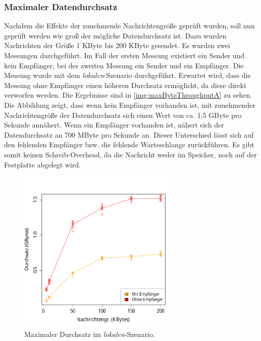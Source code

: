 \subsubsection{Maximaler Datendurchsatz}
\label{sec:maxthroughput}
Nachdem die Effekte der zunehmende Nachrichtengröße geprüft wurden, soll nun geprüft werden wie groß der mögliche Datendurchsatz ist. Dazu wurden Nachrichten der Größe 1 KByte bis 200 KByte gesendet. Es wurden zwei Messungen durchgeführt. Im Fall der ersten Messung existiert ein Sender und kein Empfänger, bei der zweiten Messung ein Sender und ein Empfänger. Die Messung wurde mit dem \textit{lokalen}-Szenario durchgeführt. Erwartet wird, dass die Messung ohne Empfänger einen höheren Durchsatz ermöglicht, da diese direkt verworfen werden. 
Die Ergebnisse sind in \autoref{img:maxByteThroughputA} zu sehen. Die Abbildung zeigt, dass wenn kein Empfänger vorhanden ist, mit zunehmender Nachrichtengröße der Datendurchsatz sich einen Wert von ca. 1,5 GByte pro Sekunde annähert. Wenn ein Empfänger vorhanden ist, nähert sich der Datendurchsatz an 700 MByte pro Sekunde an. Dieser Unterschied lässt sich auf den fehlenden Empfänger bzw. die fehlende Warteschlange zurückführen. Es gibt somit keinen Schreib-Overhead, da die Nachricht weder im Speicher, noch auf der Festplatte abgelegt wird.
\begin{figure}
\center
  \includegraphics[width=0.7\textwidth]{images/measurement/rate-limit-unlimited-consumer-vs-no-consumer.pdf}
  \caption{Maximaler Durchsatz im \textit{lokalen}-Szenario.}
  \label{img:maxByteThroughputA}
\end{figure}



